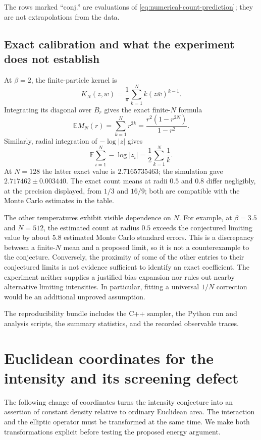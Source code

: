 \documentclass[11pt,a4paper]{article}
\numberwithin{equation}{section}
\theoremstyle{definition}
\theoremstyle{remark}
\begin{document}
The rows marked ``conj.'' are evaluations of
\eqref{eq:numerical-count-prediction}; they are not extrapolations from the data.

\subsection{Exact calibration and what the experiment does not establish}

At $\beta=2$, the finite-particle kernel is
\[
 K_N(z,w)=\frac1\pi\sum_{k=1}^N k(z\overline w)^{k-1}.
\]
Integrating its diagonal over $B_r$ gives the exact finite-$N$ formula
\[
 \mathbb E M_N(r)=\sum_{k=1}^N r^{2k}
 =\frac{r^2(1-r^{2N})}{1-r^2}.
\]
Similarly, radial integration of $-\log|z|$ gives
\[
 \mathbb E\sum_{i=1}^N-\log|z_i|=\frac12\sum_{k=1}^N\frac1k.
\]
At $N=128$ the latter exact value is $2.7165735463$; the simulation gave
$2.717462\pm0.003440$.
The exact count means at radii $0.5$ and $0.8$ differ negligibly, at the
precision displayed, from $1/3$ and $16/9$; both are compatible with the
Monte Carlo estimates in the table.

The other temperatures exhibit visible dependence on $N$.
For example, at $\beta=3.5$ and $N=512$, the estimated count at radius
$0.5$ exceeds the conjectured limiting value by about $5.8$ estimated
Monte Carlo standard errors.  This is a discrepancy between a finite-$N$
mean and a proposed limit, so it is not a counterexample to the conjecture.
Conversely, the proximity of some of the other entries to their conjectured
limits is not evidence sufficient to identify an exact coefficient.
The experiment neither supplies a justified bias expansion nor rules out
nearby alternative limiting intensities.  In particular, fitting a universal
$1/N$ correction would be an additional unproved assumption.

The reproducibility bundle includes the C++ sampler, the Python run and
analysis scripts, the summary statistics, and the recorded observable traces.


\section{Euclidean coordinates for the intensity and its screening defect}
\label{sec:screening-euclidean-coordinates}

The following change of coordinates turns the intensity conjecture into
an assertion of constant density relative to ordinary Euclidean area.
The interaction and the elliptic operator must be transformed at the
same time.  We make both transformations explicit before testing the
proposed energy argument.
\end{document}

